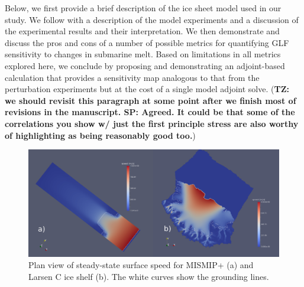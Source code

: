 \documentclass[review,oneside]{igs}
\begin{document}
Below, we first provide a brief description of the ice sheet model used in our study. We follow with a description of the model experiments and a discussion of the experimental results and their interpretation. We then demonstrate and discuss the pros and cons of a number of possible metrics for quantifying GLF sensitivity to changes in submarine melt. Based on limitations in all metrics explored here, we conclude by proposing and demonstrating an adjoint-based calculation that provides a sensitivity map analogous to that from the \cite{reese2018} perturbation experiments but at the cost of a single model adjoint solve. ({\bf{TZ: we should revisit this paragraph at some point after we finish most of revisions in the manuscript. SP: Agreed. It could be that some of the correlations you show w/ just the first principle stress are also worthy of highlighting as being reasonably good too.}})

\begin{figure}
\centering
\includegraphics[width=1\linewidth]{figs/fig1.pdf}
\caption{Plan view of steady-state surface speed for MISMIP+ (a) and Larsen C ice shelf (b). The white curves show the grounding lines.}
\label{fig1}
\end{figure}
\end{document}
